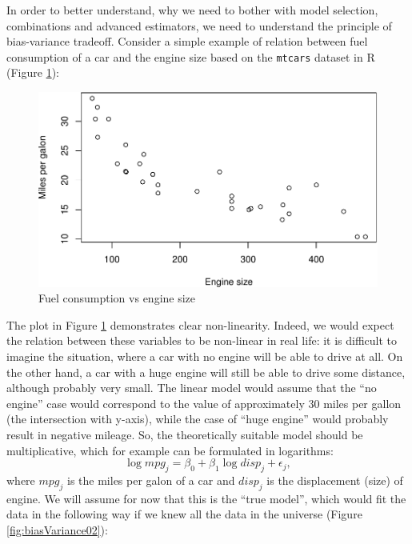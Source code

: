 \documentclass[
]{book}
\newenvironment{Shaded}{\begin{snugshade}}{\end{snugshade}}
\newcommand{\AttributeTok}[1]{\textcolor[rgb]{0.77,0.63,0.00}{#1}}
\newcommand{\FunctionTok}[1]{\textcolor[rgb]{0.00,0.00,0.00}{#1}}
\newcommand{\NormalTok}[1]{#1}
\newcommand{\SpecialCharTok}[1]{\textcolor[rgb]{0.00,0.00,0.00}{#1}}
\newcommand{\StringTok}[1]{\textcolor[rgb]{0.31,0.60,0.02}{#1}}
\theoremstyle{definition}
\theoremstyle{definition}
\theoremstyle{definition}
\theoremstyle{definition}
\theoremstyle{remark}
\begin{document}
In order to better understand, why we need to bother with model selection, combinations and advanced estimators, we need to understand the principle of bias-variance tradeoff. Consider a simple example of relation between fuel consumption of a car and the engine size based on the \texttt{mtcars} dataset in R (Figure \ref{fig:biasVariance01}):

\begin{Shaded}
\end{Shaded}

\begin{figure}
\centering
\includegraphics{Svetunkov---Statistics-for-Business-Analytics_files/figure-latex/biasVariance01-1.pdf}
\caption{\label{fig:biasVariance01}Fuel consumption vs engine size}
\end{figure}

The plot in Figure \ref{fig:biasVariance01} demonstrates clear non-linearity. Indeed, we would expect the relation between these variables to be non-linear in real life: it is difficult to imagine the situation, where a car with no engine will be able to drive at all. On the other hand, a car with a huge engine will still be able to drive some distance, although probably very small. The linear model would assume that the ``no engine'' case would correspond to the value of approximately 30 miles per gallon (the intersection with y-axis), while the case of ``huge engine'' would probably result in negative mileage. So, the theoretically suitable model should be multiplicative, which for example can be formulated in logarithms:
\begin{equation}
    \log mpg_j = \beta_0 + \beta_1 \log disp_j + \epsilon_j ,
    \label{eq:mpgLinear}
\end{equation}
where \(mpg_j\) is the miles per galon of a car and \(disp_j\) is the displacement (size) of engine. We will assume for now that this is the ``true model'', which would fit the data in the following way if we knew all the data in the universe (Figure \ref{fig:biasVariance02}):
\end{document}
